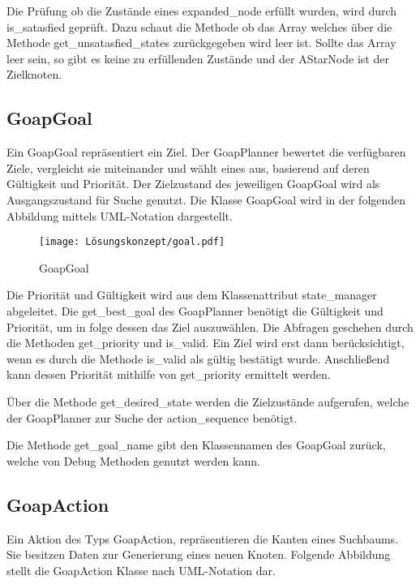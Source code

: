 Die Prüfung ob die Zustände eines expanded\_node erfüllt wurden, wird durch is\_satasfied geprüft. Dazu schaut die Methode ob das Array welches über die Methode get\_unsatasfied\_states zurückgegeben wird leer ist. Sollte das Array leer sein, so gibt es keine zu erfüllenden Zustände und der AStarNode ist der Zielknoten.


\subsection{GoapGoal}

Ein GoapGoal repräsentiert ein Ziel. Der GoapPlanner bewertet die verfügbaren Ziele, vergleicht sie miteinander und wählt eines aus, basierend auf deren Gültigkeit und Priorität. Der Zielzustand des jeweiligen GoapGoal wird als Ausgangszustand für Suche genutzt. Die Klasse GoapGoal wird in der folgenden Abbildung mittels UML-Notation dargestellt.

\begin{figure}[h]
  \centering
  \texttt{[image: Lösungskonzept/goal.pdf]}
	\captionsetup{justification=justified, format=plain}
  \caption{GoapGoal}
  \label{fig:GoapGoal}
\end{figure}

Die Priorität und Gültigkeit wird aus dem Klassenattribut state\_manager abgeleitet. Die get\_best\_goal des GoapPlanner benötigt die Gültigkeit und Priorität, um in folge dessen das Ziel auszuwählen. Die Abfragen geschehen durch die Methoden get\_priority und is\_valid. Ein Ziel wird erst dann berücksichtigt, wenn es durch die Methode is\_valid als gültig bestätigt wurde. Anschließend kann dessen Priorität mithilfe von get\_priority ermittelt werden. 

Über die Methode get\_desired\_state werden die Zielzustände aufgerufen, welche der GoapPlanner zur Suche der action\_sequence benötigt. 

Die Methode get\_goal\_name gibt den Klassennamen des GoapGoal zurück, welche von Debug Methoden genutzt werden kann.


\subsection{GoapAction}

Ein Aktion des Typs GoapAction, repräsentieren die Kanten eines Suchbaums. Sie besitzen Daten zur Generierung eines neuen Knoten. Folgende Abbildung stellt die GoapAction Klasse nach UML-Notation dar.

